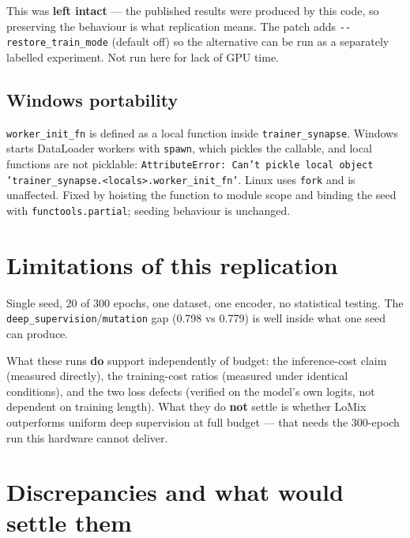 \documentclass[11pt,a4paper]{article}
\newcommand{\code}[1]{\texttt{\small #1}}
\begin{document}
This was \textbf{left intact} --- the published results were produced by this
code, so preserving the behaviour is what replication means. The patch adds
\code{-{}-restore\_train\_mode} (default off) so the alternative can be run as a
separately labelled experiment. Not run here for lack of GPU time.

\subsection{Windows portability}

\code{worker\_init\_fn} is defined as a local function inside
\code{trainer\_synapse}. Windows starts DataLoader workers with \code{spawn},
which pickles the callable, and local functions are not picklable:
\code{AttributeError: Can't pickle local object
'trainer\_synapse.<locals>.worker\_init\_fn'}. Linux uses \code{fork} and is
unaffected. Fixed by hoisting the function to module scope and binding the seed
with \code{functools.partial}; seeding behaviour is unchanged.

\section{Limitations of this replication}

Single seed, 20 of 300 epochs, one dataset, one encoder, no statistical testing.
The \code{deep\_supervision}/\code{mutation} gap (0.798 vs 0.779) is well inside
what one seed can produce.

What these runs \textbf{do} support independently of budget: the
inference-cost claim (measured directly), the training-cost ratios (measured
under identical conditions), and the two loss defects (verified on the model's
own logits, not dependent on training length). What they do \textbf{not} settle
is whether LoMix outperforms uniform deep supervision at full budget --- that
needs the 300-epoch run this hardware cannot deliver.

\section{Discrepancies and what would settle them}
\end{document}
